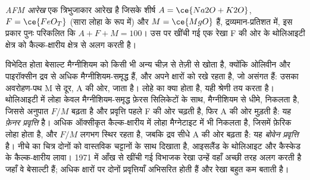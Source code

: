 \begin{definition}[AFM आरेख]\label{def:b2:magmatic-series:afm}
\emph{AFM आरेख} एक त्रिभुजाकार आरेख है जिसके शीर्ष
$A = \ce{Na2O + K2O}$, $F = \ce{FeO_T}$ (सारा लोहा  के रूप में) और $M = \ce{MgO}$ हैं,
द्रव्यमान-प्रतिशत में, इस प्रकार पुनः परिकलित कि $A + F + M = 100$। उस पर खींची गई एक रेखा
F की ओर के थोलिआइटी क्षेत्र को कैल्क-क्षारीय क्षेत्र से अलग करती है।
\end{definition}

विभेदित होता बेसाल्ट मैग्नीशियम को किसी भी अन्य चीज़ से तेज़ी से खोता है, क्योंकि ओलिवीन और
पाइरॉक्सीन द्रव से अधिक मैग्नीशियम-समृद्ध हैं, और अपने क्षारों को रखे रहता है, जो
असंगत हैं: उसका अवरोहण-पथ M से दूर, A की ओर, जाता है। लोहे का क्या होता है,
यही श्रेणी तय करता है। थोलिआइटी  में लोहा केवल
मैग्नीशियम-समृद्ध फ़ेरस सिलिकेटों के साथ, मैग्नीशियम से धीमे, निकलता है, जिससे अनुपात
$F/M$ बढ़ता है और प्रवृत्ति पहले F की ओर चढ़ती है, फिर A की ओर मुड़ती है: यह
\emph{फ़ेनर प्रवृत्ति} है। अधिक ऑक्सीकृत कैल्क-क्षारीय  में लोहा
मैग्नेटाइट में भी निकलता है, जिसमें फ़ेरिक लोहा होता है, और $F/M$ लगभग स्थिर रहता है, जबकि द्रव
सीधे A की ओर बढ़ता है: यह \emph{बोवेन प्रवृत्ति} है। नीचे का चित्र दोनों को
वास्तविक चट्टानों के साथ दिखाता है, आइसलैंड के थोलिआइट और कैस्केड के कैल्क-क्षारीय लावा।
1971 में आँख से खींची गई विभाजक रेखा उन्हें वहाँ अच्छी तरह अलग करती है जहाँ वे बेसाल्टी हैं;
अधिक क्षारों पर दोनों प्रवृत्तियाँ अभिसरित होती हैं और रेखा बहुत कम बताती है।

